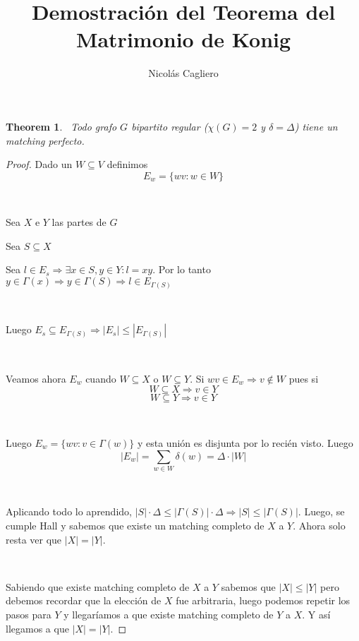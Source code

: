 \documentclass[11pt]{article}
\title{Demostración del Teorema del Matrimonio de Konig}
\author{Nicolás Cagliero}
\newtheorem{theorem}{Theorem}
\begin{document}
\maketitle
\begin{theorem}\par
\
Todo grafo $G$ bipartito regular ($\chi(G) = 2$ y $\delta = \Delta$) tiene un matching perfecto.
\

\end{theorem}

\begin{proof} Dado un $W \subseteq V$ definimos \[E_w = \{wv: w \in W\}\] \par
\

Sea $X$ e $Y$ las partes de $G$\par
Sea $S \subseteq X$\par
Sea $l \in E_s \Rightarrow \exists x \in S, y \in Y: l = xy$. Por lo tanto $y \in \Gamma(x) \Rightarrow y \in \Gamma(S) \Rightarrow l \in E_{\Gamma(S)}$\par
\

Luego $E_s \subseteq E_{\Gamma(S)} \Rightarrow |E_s| \le |E_{\Gamma(S)}|$\par
\

Veamos ahora $E_w$ cuando $W \subseteq X$ o $W \subseteq Y$. Si $wv \in E_w \Rightarrow v \notin W$ pues si \[W \subseteq X \Rightarrow v \in Y\] \[W \subseteq Y \Rightarrow v \in Y\] \par
\

Luego $E_w = \{wv: v \in \Gamma(w)\}$ y esta unión es disjunta por lo recién visto. Luego \[|E_w| = \sum_{w \in W} \delta(w) = \Delta \cdot |W|\]\par
\

Aplicando todo lo aprendido, $|S| \cdot \Delta \le |\Gamma(S)| \cdot \Delta \Rightarrow |S| \le |\Gamma(S)|$. Luego, se cumple Hall y sabemos que existe un matching completo de $X$ a $Y$. Ahora solo resta ver que $|X| = |Y|$.\par
\

Sabiendo que existe matching completo de $X$ a $Y$ sabemos que $|X| \le |Y|$ pero debemos recordar que la elección de $X$ fue arbitraria, luego podemos repetir los pasos para $Y$ y llegaríamos a que existe matching completo de $Y$ a $X$. Y así llegamos a que $|X| = |Y|$.


\end{proof}
\end{document}
